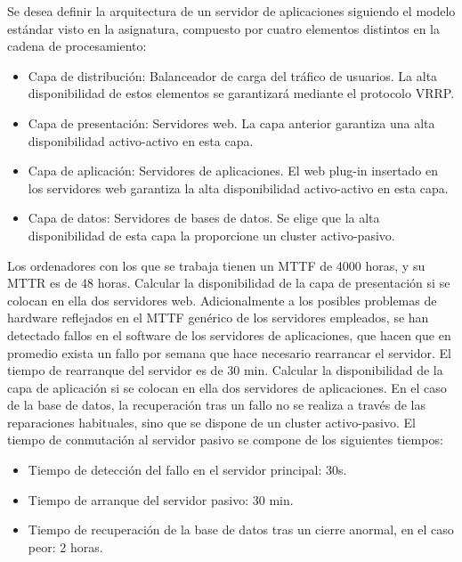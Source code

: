 \begin{problem}[11]
Se desea definir la arquitectura de un servidor de aplicaciones siguiendo el modelo estándar visto en la asignatura, compuesto por cuatro elementos distintos en la cadena de procesamiento:
\begin{itemize}
	\item Capa de distribución: Balanceador de carga del tráfico de usuarios.
La alta disponibilidad de estos elementos se garantizará mediante el
protocolo VRRP.
	\item Capa de presentación: Servidores web. La capa anterior garantiza una alta disponibilidad activo-activo en esta capa.
	\item Capa de aplicación: Servidores de aplicaciones. El web plug-in
insertado en los servidores web garantiza la alta disponibilidad
activo-activo en esta capa.
	\item Capa de datos: Servidores de bases de datos. Se elige que la
alta disponibilidad de esta capa la proporcione un cluster
activo-pasivo.

\end{itemize}

Los ordenadores con los que se trabaja tienen un MTTF de 4000 horas, y su MTTR es de 48 horas.
\ppart Calcular la disponibilidad de la capa de presentación si se colocan en ella dos servidores web.
\ppart Adicionalmente a los posibles problemas de hardware reflejados en el MTTF genérico de los servidores empleados, se han detectado fallos en el software de los servidores de aplicaciones, que hacen que en promedio exista un fallo por semana que hace necesario rearrancar el servidor. El tiempo de rearranque del servidor es de 30 min. Calcular la
disponibilidad de la capa de aplicación si se colocan en ella dos servidores de aplicaciones.
\ppart En el caso de la base de datos, la recuperación tras un fallo no se realiza a través de las reparaciones habituales, sino que se dispone de un cluster activo-pasivo. El tiempo de conmutación al servidor pasivo se compone de los siguientes tiempos:
\begin{itemize}
	\item Tiempo de detección del fallo en el servidor principal: 30s.
	\item Tiempo de arranque del servidor pasivo: 30 min.
	\item Tiempo de recuperación de la base de datos tras un cierre anormal, en el caso peor: 2 horas.
\end{itemize}


\end{problem}
